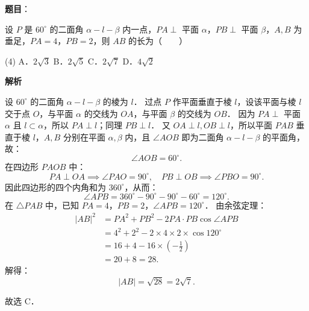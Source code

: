 \begin{answer}

\textbf{题目}：

设 $P$ 是 $60^\circ$ 的二面角 $\alpha - l - \beta$ 内一点，$PA \perp$ 平面 $\alpha$，$PB \perp$ 平面 $\beta$，$A, B$ 为垂足，$PA = 4$，$PB = 2$，则 $AB$ 的长为\mbox{（　　）}

\begin{gkopts}(4)
\task A．$2\sqrt{3}$
\task B．$2\sqrt{5}$
\task C．$2\sqrt{7}$
\task D．$4\sqrt{2}$
\end{gkopts}

\textbf{解析}

设 $60^\circ$ 的二面角 $\alpha - l - \beta$ 的棱为 $l$．
过点 $P$ 作平面垂直于棱 $l$，设该平面与棱 $l$ 交于点 $O$，与平面 $\alpha$ 的交线为 $OA$，与平面 $\beta$ 的交线为 $OB$．
因为 $PA \perp$ 平面 $\alpha$ 且 $l \subset \alpha$，所以 $PA \perp l$；同理 $PB \perp l$．
又 $OA \perp l, OB \perp l$，所以平面 $PAB$ 垂直于棱 $l$，$A, B$ 分别在平面 $\alpha, \beta$ 内，且 $\angle AOB$ 即为二面角 $\alpha - l - \beta$ 的平面角，故：
\nopagebreak[4]
\[
\angle AOB = 60^\circ.
\]
在四边形 $PAOB$ 中：
\nopagebreak[4]
\[
PA \perp OA \implies \angle PAO = 90^\circ, \quad PB \perp OB \implies \angle PBO = 90^\circ.
\]
因此四边形的四个内角和为 $360^\circ$，从而：
\nopagebreak[4]
\[
\angle APB = 360^\circ - 90^\circ - 90^\circ - 60^\circ = 120^\circ.
\]
在 $\triangle PAB$ 中，已知 $PA = 4$，$PB = 2$，$\angle APB = 120^\circ$．
由余弦定理：
\nopagebreak[4]
\[
\begin{aligned}
|AB|^2 &= PA^2 + PB^2 - 2 PA \cdot PB \cos\angle APB \\
&= 4^2 + 2^2 - 2 \times 4 \times 2 \times \cos 120^\circ \\
&= 16 + 4 - 16 \times \left(-\frac{1}{2}\right) \\
&= 20 + 8 = 28.
\end{aligned}
\]
解得：
\nopagebreak[4]
\[
|AB| = \sqrt{28} = 2\sqrt{7}.
\]

故选 C．


\end{answer}
